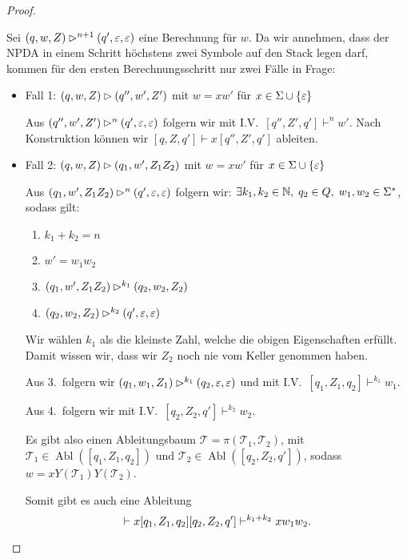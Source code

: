 \begin{proof}
\begin{description}
      Sei $(q,w,Z) \rhd^{n+1} (q',\varepsilon,\varepsilon)$ eine Berechnung für $w$. Da wir annehmen, 
      dass der \ac{NPDA} in einem Schritt höchstens zwei Symbole auf den Stack legen darf, kommen für den ersten Berechnungsschritt nur zwei Fälle in Frage:
      \begin{itemize}
      \item Fall 1: $(q,w,Z)\rhd (q'', w',Z')$ mit $w=xw'$ für $x\in\Sigma\cup\{\varepsilon\}$
      
      Aus $(q'', w',Z')\rhd^n (q',\varepsilon,\varepsilon)$ folgern wir mit I.V.\
      $[q'', Z',q']\vdash^n w'$.
      Nach Konstruktion können wir $[q,Z,q']\vdash x [q'', Z',q']$ ableiten.

      
      \item Fall 2: $(q,w,Z)\rhd (q_1, w',Z_1Z_2)$ mit $w=xw'$ für $x\in\Sigma\cup\{\varepsilon\}$

            Aus $(q_1, w',Z_1Z_2)\rhd^n (q',\varepsilon,\varepsilon)$ folgern wir:
      $\exists k_1,k_2\in\mathbb{N}, \; q_2\in Q, \; w_1,w_2\in \Sigma^*$, sodass gilt:
      \begin{enumerate}
      \item $k_1+k_2=n$
      \item $w'=w_1w_2$
      \item $(q_1, w',Z_1Z_2)\rhd^{k_1} (q_2, w_2,Z_2)$
      \item $(q_2, w_2,Z_2)\rhd^{k_2} (q',\varepsilon,\varepsilon)$
      \end{enumerate}
      Wir wählen $k_1$ als die kleinste Zahl, welche die obigen Eigenschaften erfüllt.
      Damit wissen wir, dass wir $Z_2$ noch nie vom Keller genommen haben.
      
      Aus 3.\ folgern wir $(q_1, w_1,Z_1)\rhd^{k_1} (q_2, \varepsilon,\varepsilon)$ und mit I.V.\
      $[q_1, Z_1, q_2] \vdash^{k_1} w_1$.
      
      Aus 4.\ folgern wir mit I.V.\ $[q_2, Z_2, q'] \vdash^{k_2} w_2$.
      
      Es gibt also einen Ableitungsbaum $\mathcal{T} = \pi(\mathcal{T}_1,\mathcal{T}_2)$, mit $\mathcal{T}_1 \in \operatorname{Abl}([q_1, Z_1, q_2])$ und $\mathcal{T}_2 \in \operatorname{Abl}([q_2, Z_2, q'])$, sodass $w = xY(\mathcal{T}_1)Y(\mathcal{T}_2)$.
      
      Somit gibt es auch eine Ableitung
      \begin{equation*}
      [q, Z, q'] \vdash x[q_1,Z_1,q_2][q_2, Z_2, q'] \vdash^{k_1+k_2} xw_1w_2. \qedhere
      \end{equation*}
      \end{itemize}
     \end{description}
\end{proof}

